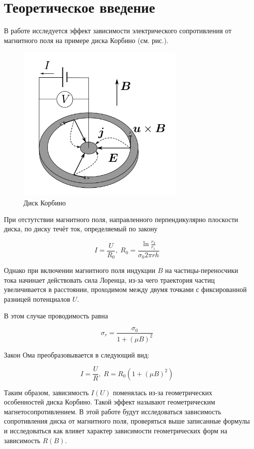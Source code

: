 \documentclass[a4paper, 12pt]{article}%
\begin{document}
\section{Теоретическое введение}

В работе исследуется эффект зависимости электрического сопротивления от магнитного поля на примере диска Корбино (см. рис.).

\begin{figure}[h]
    \centering
    \includegraphics[width = 5 cm]{images/1.png}
    \caption{Диск Корбино}
    \label{karb}
\end{figure}

При отстутствии магнитного поля, направленного перпендикулярно плоскости диска, по диску течёт ток, определяемый по закону 

\begin{equation}
    I = \frac{U}{R_0}, \; R_0 = \frac{\ln{\frac{r_2}{r_1}}}{\sigma_0 2 \pi r h}
\end{equation}

Однако при включении магнитного поля индукции $B$ на частицы-переносчики тока начинает действовать сила Лоренца, из-за чего траектория частиц увеличивается в расстоянии, проходимом между двумя точками с фиксированной разницей потенциалов $U$.

В этом случае проводимость  равна 

\begin{equation}
    \sigma_r = \frac{\sigma_0}{1 + (\mu B)^2}
\end{equation}

Закон Ома преобразовывается в следующий вид:

\begin{equation}
    I = \frac{U}{R}, \; R = R_0 (1 + (\mu B)^2)
\end{equation}

Таким образом, зависимость $I(U)$ поменялась из-за геометрических особенностей диска Корбино. Такой эффект называют геометрическим магнетосопротивлением. В этой работе будут исследоваться зависимость сопротивления диска от магнитного поля, проверяться выше записанные формулы и исследоваться как влияет характер зависимости геометрических форм на зависимость $R(B)$.
\end{document}
